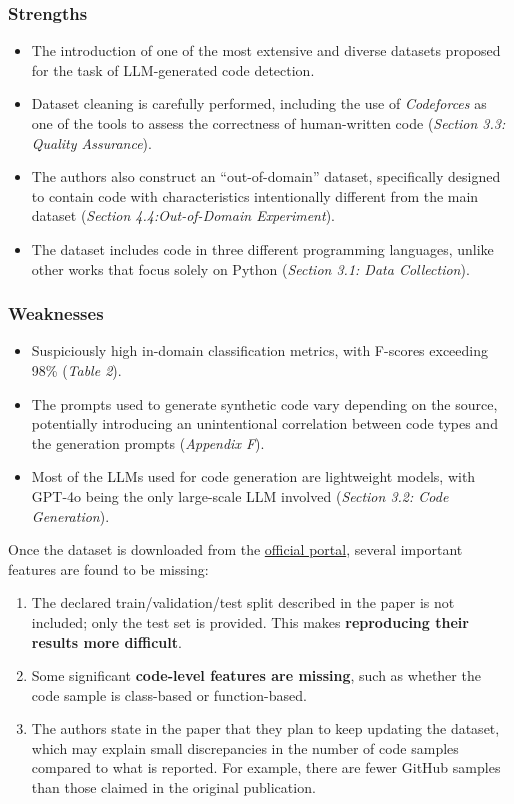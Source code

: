 \subsubsection*{Strengths}
\begin{itemize}
    \item The introduction of one of the most extensive and diverse datasets proposed for the task of LLM-generated code detection.
    \item Dataset cleaning is carefully performed, including the use of \textit{Codeforces} as one of the tools to assess the correctness of human-written code {(\scriptsize\textit{Section 3.3: Quality Assurance})}.
    \item The authors also construct an ``out-of-domain'' dataset, specifically designed to contain code with characteristics intentionally different from the main dataset {(\scriptsize\textit{Section 4.4:Out-of-Domain Experiment})}.
    \item The dataset includes code in three different programming languages, unlike other works that focus solely on Python {(\scriptsize\textit{Section 3.1: Data Collection})}.
\end{itemize}

\subsubsection*{Weaknesses}
\begin{itemize}
    \item Suspiciously high in-domain classification metrics, with F-scores exceeding 98\% {(\scriptsize\textit{Table 2})}.
    \item The prompts used to generate synthetic code vary depending on the source, potentially introducing an unintentional correlation between code types and the generation prompts {(\scriptsize\textit{Appendix F})}.
    \item Most of the LLMs used for code generation are lightweight models, with GPT-4o being the only large-scale LLM involved {(\scriptsize\textit{Section 3.2: Code Generation})}.
\end{itemize}


Once the dataset is downloaded from the \href{https://huggingface.co/datasets/DaniilOr/CoDET-M4}{official portal}, 
several important features are found to be missing:
\begin{enumerate}
    \item The declared train/validation/test split described in the paper is not included; only the test set is provided. This makes \textbf{reproducing their results more difficult}.
    \item Some significant \textbf{code-level features are missing}, such as whether the code sample is class-based or function-based.
    \item The authors state in the paper that they plan to keep updating the dataset, which may explain small discrepancies in the number of code samples compared to what is reported. For example, there are fewer GitHub samples than those claimed in the original publication.
\end{enumerate}


